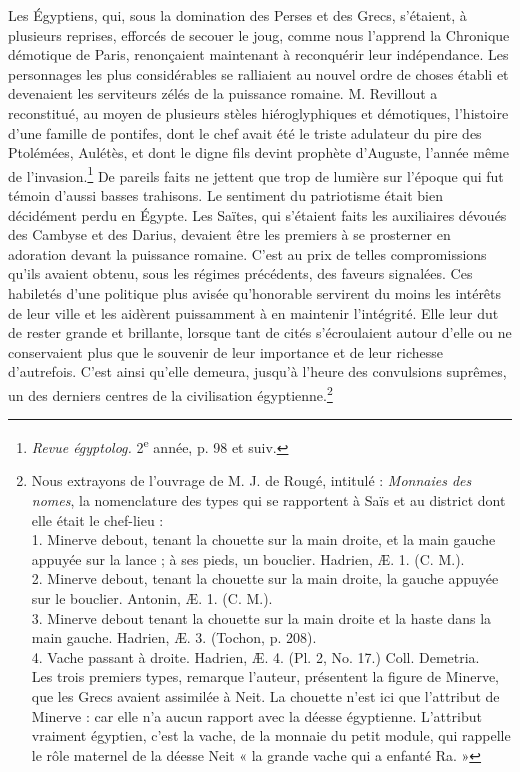 \documentclass[a4paper, 11pt, oneside]{article}
\begin{document}
Les Égyptiens, qui, sous la domination des Perses et des Grecs, s'étaient, à plusieurs reprises, efforcés de secouer le joug, comme nous l'apprend la Chronique démotique de Paris, renonçaient maintenant à reconquérir leur indépendance. Les personnages les plus considérables se ralliaient au nouvel ordre de choses établi et devenaient les serviteurs zélés de la puissance romaine. M. Revillout a reconstitué, au moyen de plusieurs stèles hiéroglyphiques et démotiques, l'histoire d'une famille de pontifes, dont le chef avait été le triste adulateur du pire des Ptolémées, Aulétès, et dont le digne fils devint prophète d'Auguste, l'année même de l'invasion.\footnote{\emph{Revue égyptolog.} 2\textsuperscript{e} année, p. 98 et suiv.} De pareils faits ne jettent que trop de lumière sur l'époque qui fut témoin d'aussi basses trahisons. Le sentiment du patriotisme était bien décidément perdu en Égypte. Les Saïtes, qui s'étaient faits les auxiliaires dévoués des Cambyse et des Darius, devaient être les premiers à se prosterner en adoration devant la puissance romaine. C'est au prix de telles compromissions qu'ils avaient obtenu, sous les régimes précédents, des faveurs signalées. Ces habiletés d'une politique plus avisée qu'honorable servirent du moins les intérêts de leur ville et les aidèrent puissamment à en maintenir l'intégrité. Elle leur dut de rester grande et brillante, lorsque tant de cités s'écroulaient autour d'elle ou ne conservaient plus que le souvenir de leur importance et de leur richesse d'autrefois. C'est ainsi qu'elle demeura, jusqu'à l'heure des convulsions suprêmes, un des derniers centres de la civilisation égyptienne.\footnote{Nous extrayons de l'ouvrage de M. J. de Rougé, intitulé : \emph{Monnaies des nomes}, la nomenclature des types qui se rapportent à Saïs et au district dont elle était le chef-lieu :\\\hspace*{5mm}1. Minerve debout, tenant la chouette sur la main droite, et la main gauche appuyée sur la lance ; à ses pieds, un bouclier. Hadrien, Æ. 1. (C. M.).\\\hspace*{5mm}2. Minerve debout, tenant la chouette sur la main droite, la gauche appuyée sur le bouclier. Antonin, Æ. 1. (C. M.).\\\hspace*{5mm}3. Minerve debout tenant la chouette sur la main droite et la haste dans la main gauche. Hadrien, Æ. 3. (Tochon, p. 208).\\\hspace*{5mm}4. Vache passant à droite. Hadrien, Æ. 4. (Pl. 2, No. 17.) Coll. Demetria.\\\hspace*{5mm}Les trois premiers types, remarque l'auteur, présentent la figure de Minerve, que les Grecs avaient assimilée à Neit. La chouette n'est ici que l'attribut de Minerve : car elle n'a aucun rapport avec la déesse égyptienne. L'attribut vraiment égyptien, c'est la vache, de la monnaie du petit module, qui rappelle le rôle maternel de la déesse Neit « la grande vache qui a enfanté Ra. »}
\end{document}
